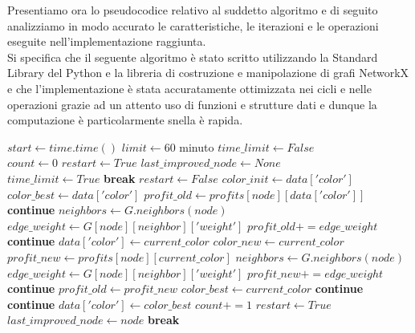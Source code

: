 Presentiamo ora lo pseudocodice relativo al suddetto algoritmo e di seguito analizziamo in modo accurato le caratteristiche, le iterazioni e le operazioni eseguite nell'implementazione raggiunta.\\

Si specifica che il seguente algoritmo è stato scritto utilizzando la Standard Library del Python e la libreria di costruzione e manipolazione di grafi NetworkX e che l'implementazione è stata accuratamente ottimizzata nei cicli e nelle operazioni grazie ad un attento uso di funzioni e strutture dati e dunque la computazione è particolarmente snella è rapida.\\

\begin{algorithmic}

\State $start\gets time.time()$
\State $limit\gets 60$  minuto
\State $time\_limit\gets False$ \\

\State $count\gets 0$
\State $restart\gets True$
\State $last\_improved\_node\gets None$\\

		\State $time\_limit\gets True$ 
		\State \textbf{break}
	\EndIf
	\State $restart\gets False$
		\State $color\_init\gets data['color']$
		\State $color\_best\gets data['color']$
		\State $profit\_old\gets profits[node][data['color']]$
			\State \textbf{continue}
		\EndIf
		\State $neighbors\gets G.neighbors(node)$
				\State $edge\_weight\gets G[node][neighbor]['weight']$
				\State $profit\_old += edge\_weight$
			\Else
				\State \textbf{continue}
			\EndIf
		\EndFor
				\State $data['color']\gets current\_color$
				\State $color\_new\gets current\_color$
				\State $profit\_new\gets profits[node][current\_color]$
				\State $neighbors\gets G.neighbors(node)$
						\State $edge\_weight\gets G[node][neighbor]['weight']$
						\State $profit\_new += edge\_weight$
					\Else
						\State \textbf{continue}
					\EndIf
						\State $profit\_old\gets profit\_new$
						\State $color\_best\gets current\_color$
					\Else
						\State \textbf{continue}
					\EndIf
				\EndFor
			\Else
				\State \textbf{continue}
			\EndIf
		\EndFor
		\State $data['color']\gets color\_best$
			\State $count += 1$
			\State $restart\gets True$
			\State $last\_improved\_node\gets node$
			\State \textbf{break}
		\EndIf
	\EndFor
\EndWhile \\


\end{algorithmic}
